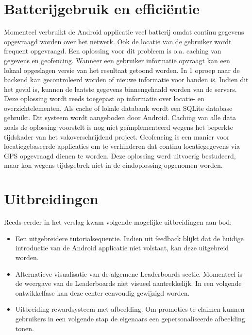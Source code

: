 \section{Batterijgebruik en efficiëntie}
Momenteel verbruikt de Android applicatie veel batterij omdat continu gegevens opgevraagd worden over het netwerk. Ook de locatie van de gebruiker wordt frequent opgevraagd.
Een oplossing voor dit probleem is o.a. caching van gegevens en geofencing. Wanneer een gebruiker informatie opvraagt kan een lokaal opgeslagen versie van het resultaat getoond worden. In 1 oproep naar de backend kan gecontroleerd worden of nieuwe informatie voor handen is. Indien dit het geval is, kunnen de laatste gegevens binnengehaald worden van de servers. Deze oplossing wordt reeds toegepast op informatie over locatie- en overzichtelementen. Als cache of lokale databank wordt een SQLite database gebruikt. Dit systeem wordt aangeboden door Android. Caching van alle data zoals de oplossing voorstelt is nog niet geïmplementeerd wegens het beperkte tijdskader van het vakoverschrijdend project.
Geofencing is een manier voor locatiegebaseerde applicaties om te verhinderen dat continu locatiegegevens via GPS opgevraagd dienen te worden. Deze oplossing werd uitvoerig bestudeerd, maar kon wegens tijdsgebrek niet in de eindoplossing opgenomen worden.
\section{Uitbreidingen}
Reeds eerder in het verslag kwam volgende mogelijke uitbreidingen aan bod:
\begin{itemize}
	\item Een uitgebreidere tutorialsequentie. Indien uit feedback blijkt dat de huidige introductie van de Android applicatie niet volstaat, kan deze uitgebreid worden.
	\item Alternatieve visualisatie van de algemene Leaderboards-sectie. Momenteel is de weergave van de Leaderboards niet visueel aantrekkelijk. In een volgende ontwikkelfase kan deze echter eenvoudig gewijzigd worden.
	\item Uitbreiding rewardsysteem met afbeelding. Om promoties te claimen kunnen gebruikers in een volgende stap de eigenaars een gepersonaliseerde afbeelding tonen.
\end{itemize}



